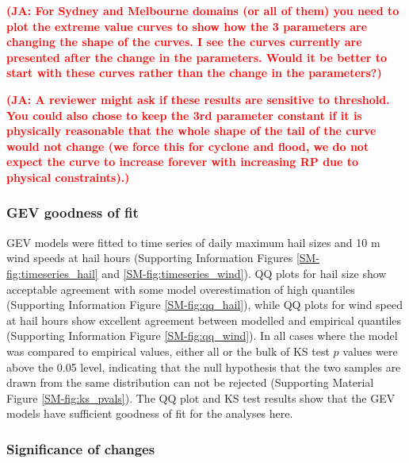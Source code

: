 \documentclass[]{agujournal2019}\usepackage[]{graphicx}\usepackage[]{xcolor}
\newcommand*{\todo}[1]{\textbf{\textcolor{red}{(#1)}}}
\begin{document}
\todo{JA: For Sydney and Melbourne domains (or all of them) you need to plot the
 extreme value curves to show how the 3 parameters are changing the shape of the
 curves. I see the curves currently are presented after the change in the
 parameters. Would it be better to start with these curves rather than the
 change in the parameters?}

\todo{JA: A reviewer might ask if these results are sensitive to threshold. You
could also chose to keep the 3rd parameter constant if it is physically
reasonable that the whole shape of the tail of the curve would not change (we
force this for cyclone and flood, we do not expect the curve to increase forever
with increasing RP due to physical constraints).}

\subsubsection{GEV goodness of fit}

GEV models were fitted to time series of daily maximum hail sizes and 10 m wind
speeds at hail hours (Supporting Information Figures
\ref{SM-fig:timeseries_hail} and \ref{SM-fig:timeseries_wind}). QQ plots for
hail size show acceptable agreement with some model overestimation of high
quantiles (Supporting Information Figure \ref{SM-fig:qq_hail}), while QQ plots
for wind speed at hail hours show excellent agreement between modelled and
empirical quantiles (Supporting Information Figure \ref{SM-fig:qq_wind}). In all
cases where the model was compared to empirical values, either all or the bulk
of KS test $p$ values were above the 0.05 level, indicating that the null
hypothesis that the two samples are drawn from the same distribution can not be
rejected (Supporting Material Figure \ref{SM-fig:ks_pvals}). The QQ plot and KS
test results show that the GEV models have sufficient goodness of fit for the
analyses here. 

\subsubsection{Significance of changes}
\end{document}
